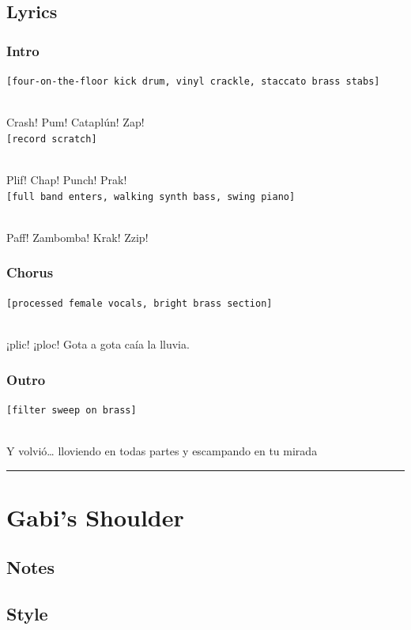 \documentclass[]{article}
\begin{document}
\subsection{Lyrics}\label{lyrics-39}

\subsubsection{Intro}\label{intro-14}

\texttt{{[}four-on-the-floor\ kick\ drum,\ vinyl\ crackle,\ staccato\ brass\ stabs{]}}\strut \\
Crash! Pum! Cataplún! Zap!\\
\texttt{{[}record\ scratch{]}}\strut \\
Plif! Chap! Punch! Prak!\\
\texttt{{[}full\ band\ enters,\ walking\ synth\ bass,\ swing\ piano{]}}\strut \\
Paff! Zambomba! Krak! Zzip!

\subsubsection{Chorus}\label{chorus-70}

\texttt{{[}processed\ female\ vocals,\ bright\ brass\ section{]}}\strut \\
¡plic! ¡ploc! Gota a gota caía la lluvia.

\subsubsection{Outro}\label{outro-13}

\texttt{{[}filter\ sweep\ on\ brass{]}}\strut \\
Y volvió\ldots{} lloviendo en todas partes y escampando en tu mirada

\begin{center}\rule{0.5\linewidth}{0.5pt}\end{center}

\section{Gabi's Shoulder}\label{gabis-shoulder}

\subsection{Notes}\label{notes-40}

\subsection{Style}\label{style-40}
\end{document}
